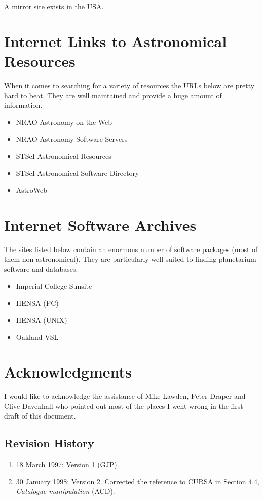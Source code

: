 A mirror site exists in the USA. 

\section{Internet Links to Astronomical Resources} 
\label{sec:links}
 
When it comes to searching for a variety of resources the URLs below
are pretty hard to beat. They are well maintained and provide a huge amount
of information. 

\begin{itemize}
\item NRAO  Astronomy on the Web -- {\HTTPWref}               
\item NRAO Astronomy Software Servers -- {\HTTPYref}
\item STScI Astronomical Resources -- {\HTTPXref}          
\item STScI Astronomical Software Directory  -- {\HTTPZref} 
\item AstroWeb -- {\HTTPBGref}
\end{itemize}

\section{Internet Software Archives} 
\label{sec:general}
 
The sites listed below contain an enormous number of software packages (most
of them non-astronomical). They are particularly well suited to finding
planetarium software and databases. 

\begin{itemize}
\item Imperial College Sunsite -- {\HTTPAAref}
\item HENSA (PC) -- {\HTTPABref} 
\item HENSA (UNIX) -- {\HTTPACref} 
\item Oakland VSL -- {\HTTPADref} 
\end{itemize}

\section{Acknowledgments} 
\label{sec:ack}

I would like to acknowledge the assistance of Mike Lawden, Peter Draper and 
Clive Davenhall who pointed out most of the places I went wrong 
in the first draft of this document.

\vspace{3cm}

\subsection*{Revision History}

\begin{enumerate}

  \item 18 March 1997: Version 1 (GJP).

  \item 30 January 1998: Version 2.  Corrected the reference to CURSA
   in Section 4.4, {\it Catalogue manipulation\/} (ACD).

\end{enumerate}


 

